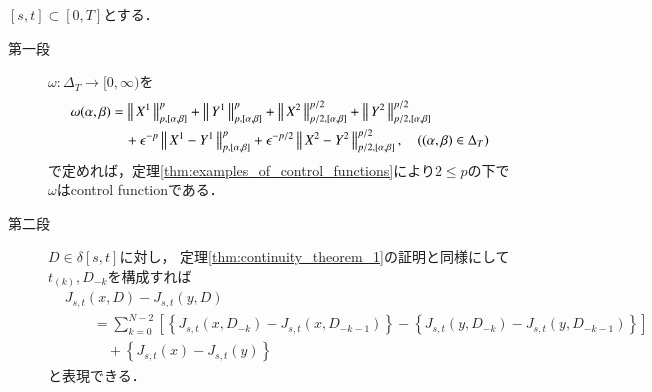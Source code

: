 	\begin{prf}
		$[s,t] \subset [0,T]$とする．
		\begin{description}
			\item[第一段]
				$\omega:\Delta_T \longrightarrow [0,\infty)$を
				\begin{align}
					\omega(\alpha,\beta) &= \left\|\, X^1\, \right\|_{p,[\alpha,\beta]}^p + \left\|\, Y^1\, \right\|_{p,[\alpha,\beta]}^p 
						+ \left\|\, X^2\, \right\|_{p/2,[\alpha,\beta]}^{p/2} + \left\|\, Y^2\, \right\|_{p/2,[\alpha,\beta]}^{p/2} \\
						&\quad + \epsilon^{-p} \left\|\, X^1 - Y^1\, \right\|_{p,[\alpha,\beta]}^p +  \epsilon^{-p/2} \left\|\, X^2 - Y^2\, \right\|_{p/2,[\alpha,\beta]}^{p/2},
					\quad ((\alpha,\beta) \in \Delta_T)
				\end{align}
				で定めれば，定理\ref{thm:examples_of_control_functions}により$2 \leq p$の下で$\omega$はcontrol functionである．
				
			\item[第二段]
				$D \in \delta[s,t]$に対し，
				定理\ref{thm:continuity_theorem_1}の証明と同様にして
				$t_{(k)},D_{-k}$を構成すれば
				\begin{align}
					&J_{s,t}(x,D) - J_{s,t}(y,D) \\
					&\qquad= \sum_{k=0}^{N-2} \left[ \left\{ J_{s,t}(x,D_{-k}) - J_{s,t}(x,D_{-k-1}) \right\} - 
						\left\{ J_{s,t}(y,D_{-k}) - J_{s,t}(y,D_{-k-1}) \right\} \right] \label{eq:continuity_theorem_2_1}\\
					&\quad\qquad + \left\{ J_{s,t}(x) - J_{s,t}(y) \right\}	\label{eq:continuity_theorem_2_2}
				\end{align}
				と表現できる．
			

\end{description}
\end{prf}
